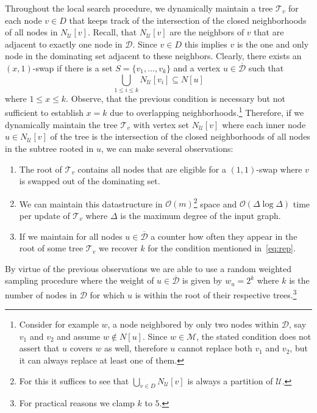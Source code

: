 \documentclass[a4paper, USenglish, cleveref, autoref, thm-restate, noalgorithm2e]{socg-lipics-v2021}
\def\Oh#1{\ensuremath{\mathcal O\!\left(#1\right)}}
\newcommand{\domset}{\ensuremath{\mathcal D}\xspace}
\newcommand{\uniquelycovered}{\ensuremath{\mathcal U}\xspace}
\newcommand{\multicovered}{\ensuremath{\mathcal M}\xspace}
\newcommand{\intersectiontree}{\ensuremath{\mathcal T}\xspace}
\newcommand{\cdomset}{\ensuremath{\overline{\mathcal D}}\xspace}
\begin{document}
Throughout the local search procedure, we dynamically maintain a tree $\intersectiontree_v$ for each node $v \in D$ that keeps track of the intersection of the closed neighborhoods of all nodes in $N_{\uniquelycovered}[v]$.
%
Recall, that $N_{\uniquelycovered}[v]$ are the neighbors of $v$ that are adjacent to exactly one node in $\domset$.
%
Since $v \in D$ this implies $v$ is the one and only node in the dominating set adjacent to these neighbors.
%
Clearly, there exists an $(x,1)$-swap if there is a set $S = \{v_1,\ldots,v_k\}$ and a vertex $u \in \cdomset$ such that
\begin{equation}\label{eq:rep}
    \bigcup_{1\leq i \leq k}N_{\uniquelycovered}[v_i] \subseteq N[u]
\end{equation}
where $1 \leq x\leq k$.
%
Observe, that the previous condition is necessary but not sufficient to establish $x=k$ due to overlapping neighborhoods.\footnote{Consider for example $w$, a node neighbored by only two nodes within $\domset$, say $v_1$ and $v_2$ and assume $w\notin N[u]$. Since $w\in\multicovered$, the stated condition does not assert that $u$ covers $w$ as well, therefore $u$ cannot replace both $v_1$ and $v_2$, but it can always replace at least one of them.}
%
Therefore, if we dynamically maintain the tree $\intersectiontree_v$ with vertex set $N_{\uniquelycovered}[v]$ where each inner node $u \in N_{\uniquelycovered}[v]$ of the tree is the intersection of the closed neighborhoods of all nodes in the subtree rooted in $u$, we can make several observations:
\begin{enumerate}
    \item The root of $\intersectiontree_v$ contains all nodes that are eligible for a $(1,1)$-swap where $v$ is swapped out of the dominating set.
    \item We can maintain this datastructure in $\Oh m$\footnote{For this it suffices to see that $\bigcup_{v\in D} N_{\uniquelycovered}[v]$ is always a partition of $\uniquelycovered$.} space and $\Oh{\Delta\log\Delta}$ time per update of $\intersectiontree_v$ where $\Delta$ is the maximum degree of the input graph.
    \item If we maintain for all nodes $u \in \cdomset$ a counter how often they appear in the root of some tree $\intersectiontree_v$ we recover $k$ for the condition mentioned in~\cref{eq:rep}.
\end{enumerate}
By virtue of the previous observations we are able to use a random weighted sampling procedure where the weight of $u \in \cdomset$ is given by $w_u = 2^{k}$ where $k$ is the number of nodes in $\domset$ for which $u$ is within the root of their respective trees.\footnote{For practical reasons we clamp $k$ to $5$.}
\end{document}

